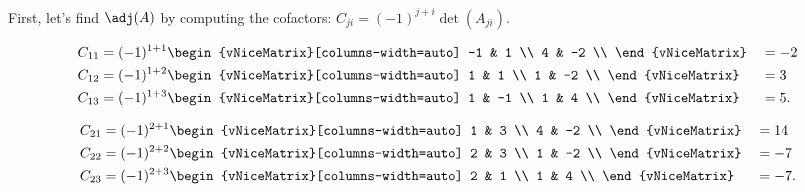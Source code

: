 \begin{solution}
  \label{sol:find_inverse_matrix}

  First, let's find $\adj(A)$ by computing the cofactors: $C_{ji} =
  (-1)^{j+i}\det(A_{ji})$.
  \noindent\begin{multicols}{3}
    \noindent\begin{alignat*}{4}
      C_{11} &= (-1)^{1+1}
      \begin{vNiceMatrix}[columns-width=auto]
        -1 & 1 \\
        4 & -2 \\
      \end{vNiceMatrix} &&= -2 \\
      C_{12} &= (-1)^{1+2}
      \begin{vNiceMatrix}[columns-width=auto]
        1 & 1 \\
        1 & -2 \\
      \end{vNiceMatrix} &&= 3 \\
      C_{13} &= (-1)^{1+3}
      \begin{vNiceMatrix}[columns-width=auto]
        1 & -1 \\
        1 & 4 \\
      \end{vNiceMatrix} &&= 5
    .\end{alignat*}

    \noindent\begin{alignat*}{4}
      C_{21} &= (-1)^{2+1}
      \begin{vNiceMatrix}[columns-width=auto]
        1 & 3 \\
        4 & -2 \\
      \end{vNiceMatrix} &&= 14 \\
      C_{22} &= (-1)^{2+2}
      \begin{vNiceMatrix}[columns-width=auto]
        2 & 3 \\
        1 & -2 \\
      \end{vNiceMatrix} &&= -7 \\
      C_{23} &= (-1)^{2+3}
      \begin{vNiceMatrix}[columns-width=auto]
        2 & 1 \\
        1 & 4 \\
      \end{vNiceMatrix} &&= -7
    .\end{alignat*}


\end{multicols}
\end{solution}
